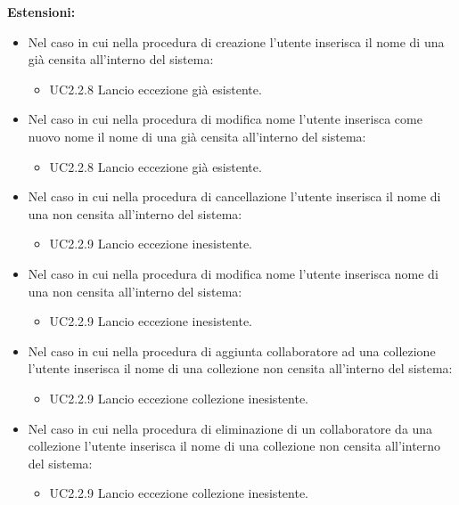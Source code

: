 \documentclass{scalatekids-article}
\begin{document}
\textbf{Estensioni:}
\begin{itemize}
\item Nel caso in cui nella procedura di creazione  l'utente inserisca il nome di una  già censita all'interno del sistema:
  \begin{itemize}
    \item UC2.2.8 Lancio eccezione  già esistente.
  \end{itemize}
\item Nel caso in cui nella procedura di modifica nome  l'utente inserisca come nuovo nome il nome di una  già censita all'interno del sistema:
  \begin{itemize}
    \item UC2.2.8 Lancio eccezione  già esistente.
  \end{itemize}
\item Nel caso in cui nella procedura di cancellazione  l'utente inserisca il nome di una  non censita all'interno del sistema:
  \begin{itemize}
    \item UC2.2.9 Lancio eccezione  inesistente.
  \end{itemize}
\item Nel caso in cui nella procedura di modifica nome  l'utente inserisca nome di una  non censita all'interno del sistema:
  \begin{itemize}
    \item UC2.2.9 Lancio eccezione  inesistente.
  \end{itemize}
\item Nel caso in cui nella procedura di aggiunta collaboratore ad una collezione l'utente inserisca il nome di una collezione non censita all'interno del sistema:
  \begin{itemize}
    \item UC2.2.9 Lancio eccezione collezione inesistente.
  \end{itemize}
\item Nel caso in cui nella procedura di eliminazione di un collaboratore da una collezione l'utente inserisca il nome di una collezione non censita all'interno del sistema:
  \begin{itemize}
    \item UC2.2.9 Lancio eccezione collezione inesistente.
  \end{itemize}

\end{itemize}
\end{document}
